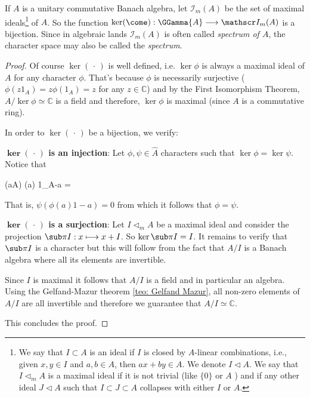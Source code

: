 \begin{proposicao}
If $A$ is a unitary commutative Banach algebra, let $\mathscr I_{m}(A)$ be the set of maximal ideals\footnote{We say that $I \subset A$ is an ideal if $I$ is closed by $A$-linear combinations, i.e., given $x, y \in I$ and $a, b \in A$, then $a x +b y \in A$. We denote $I \triangleleft A$. We say that $I \triangleleft_{m} A$ is a maximal ideal if it is not trivial (like $\{0\}$ or $A$ ) and if any other ideal $J \triangleleft A$ such that $I \subset J \subset A$ collapses with either $I$ or $A$.} of $A$. So the function $\ker(\come): \GGamma{A} \longrightarrow \mathscr I_{m}(A)$ is a bijection. Since in algebraic lands $\mathscr I_{m}(A)$ is often called \textit{spectrum of $A$}, the character space may also be called the \textit{spectrum}.  
\begin{proof}
Of course $\operatorname{ker}(\,\cdot\,)$ is well defined, i.e. $\operatorname{ker} \phi$ is always a maximal ideal of $A$ for any character $\phi$. That's because $\phi$ is necessarily surjective ($\phi\left(z 1_{A}\right)=z \phi\left(1_{A}\right)=z$ for any $z \in \mathbb{C}$) and by the First Isomorphism Theorem, $A / \operatorname{ker} \phi \simeq \mathbb{C}$ is a field and therefore, $\operatorname{ker} \phi$ is maximal (since $A$ is a commutative ring).

In order to $\ker(\,\cdot\,)$ be a bijection, we verify:
\begin{itroman}
    \item \textbf{$\boldsymbol{\operatorname{ker}(\,\cdot\,)}$ is an injection}: Let $\phi, \psi \in \widehat{A}$ characters such that $\operatorname{ker} \phi= \ker \psi$. Notice that
    \begin{eqspaced*}{(a\in A)}
    \phi(a) 1_{A}-a \in {} \phi= \psi
    \end{eqspaced*}
That is, $\psi\left(\phi(a)1-a\right)=0$ from which it follows that $\phi=\psi$.
\item \textbf{$\boldsymbol{\operatorname{ker}(\,\cdot\,)}$ is a surjection}: Let $I \triangleleft_{m} A$ be a maximal ideal and consider the projection $\sub\pi{I}: x \longmapsto x+I$. So $\ker \sub\pi{I}=I$. It remains to verify that $\sub\pi{I}$ is a character but this will follow from the fact that $A / I$ is a Banach algebra where all its elements are invertible.

Since $I$ is maximal it follows that $A / I$ is a field and in particular an algebra. Using the Gelfand-Mazur theorem \ref{teo: Gelfand Mazur}, all non-zero elements of $A / I$ are all invertible and therefore we guarantee that $A / I \simeq \mathbb{C}$. 
\end{itroman}
This concludes the proof.
\end{proof}
\end{proposicao}

